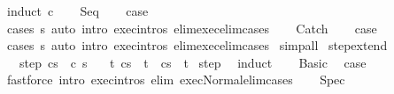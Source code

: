 \begin{isabellebody}
%
\isadelimproof
%
\endisadelimproof
%
\isatagproof
{}\isamarkupfalse%
\ {\isacharparenleft}induct\ c{\isacharparenright}\isanewline
\ \ \isamarkupfalse%
\ Seq\isanewline
\ \ \isamarkupfalse%
\ {\isacharquery}case\isanewline
\ \ \ \ \isamarkupfalse%
\ {\isacharparenleft}cases\ s{\isacharparenright}\ {\isacharparenleft}auto\ intro{\isacharcolon}\ exec{\isachardot}intros\ elim{\isacharcolon}exec{\isacharunderscore}elim{\isacharunderscore}cases{\isacharparenright}\isanewline
{}\isamarkupfalse%
\isanewline
\ \ \isamarkupfalse%
\ Catch\isanewline
\ \ \isamarkupfalse%
\ {\isacharquery}case\isanewline
\ \ \ \ \isamarkupfalse%
\ {\isacharparenleft}cases\ s{\isacharparenright}\ {\isacharparenleft}auto\ intro{\isacharcolon}\ exec{\isachardot}intros\ elim{\isacharcolon}exec{\isacharunderscore}elim{\isacharunderscore}cases{\isacharparenright}\isanewline
{}\isamarkupfalse%
\ simp{\isacharunderscore}all%
\endisatagproof
{\isafoldproof}%
%
\isadelimproof
\isanewline
%
\endisadelimproof
\isanewline
{}\isamarkupfalse%
\ step{\isacharunderscore}extend{\isacharcolon}\isanewline
\ \ \ step{\isacharcolon}\ {\isachardoublequoteopen}{\isasymGamma}{\isasymturnstile}{\isacharparenleft}c{\isacharcomma}s{\isacharparenright}\ {\isasymrightarrow}\ {\isacharparenleft}c{\isacharprime}{\isacharcomma}\ s{\isacharprime}{\isacharparenright}{\isachardoublequoteclose}\isanewline
\ \ \ {\isachardoublequoteopen}{\isasymAnd}t{\isachardot}\ {\isasymGamma}{\isasymturnstile}{\isasymlangle}c{\isacharprime}{\isacharcomma}s{\isacharprime}{\isasymrangle}\ {\isasymRightarrow}\ t\ {\isasymLongrightarrow}\ {\isasymGamma}{\isasymturnstile}{\isasymlangle}c{\isacharcomma}s{\isasymrangle}\ {\isasymRightarrow}\ t{\isachardoublequoteclose}\isanewline
%
\isadelimproof
%
\endisadelimproof
%
\isatagproof
{}\isamarkupfalse%
\ step\ \isanewline
{}\isamarkupfalse%
\ {\isacharparenleft}induct{\isacharparenright}\isanewline
\ \ \isamarkupfalse%
\ Basic\ \isamarkupfalse%
\ {\isacharquery}case\isanewline
\ \ \ \ \isamarkupfalse%
\ {\isacharparenleft}fastforce\ intro{\isacharcolon}\ exec{\isachardot}intros\ elim{\isacharcolon}\ exec{\isacharunderscore}Normal{\isacharunderscore}elim{\isacharunderscore}cases{\isacharparenright}\isanewline
{}\isamarkupfalse%
\isanewline
\ \ \isamarkupfalse%
\ Spec\ \isamarkupfalse%

\end{isabellebody}

